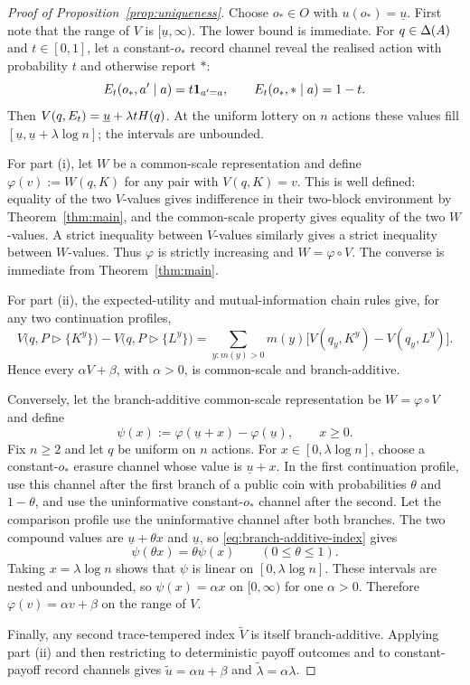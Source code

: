 \begin{proof}[Proof of Proposition~\ref{prop:uniqueness}]
Choose $o_*\in O$ with $u(o_*)=\underline u$.  First note that the range of $V$ is
$[\underline u,\infty)$.  The lower bound is immediate.  For $q\in\Delta(A)$ and $t\in[0,1]$, let a constant-$o_*$
record channel reveal the realised action with
probability $t$ and otherwise report $*$:
\[
 E_t(o_*,a'\mid a)=t\mathbf 1_{a'=a},
 \qquad
 E_t(o_*,*\mid a)=1-t.
\]
Then $V(q,E_t)=\underline u+\lambda tH(q)$.  At the uniform lottery on $n$ actions these values fill
$[\underline u,\underline u+\lambda\log n]$; the intervals are unbounded.

For part \textup{(i)}, let $W$ be a common-scale representation and define
$\varphi(v):=W(q,K)$ for any pair with $V(q,K)=v$.  This is well defined: equality of the two $V$-values gives
indifference in their two-block environment by Theorem~\ref{thm:main}, and the common-scale property gives equality
of the two $W$-values.  A strict inequality between $V$-values similarly gives a strict inequality between
$W$-values.  Thus $\varphi$ is strictly increasing and $W=\varphi\circ V$.  The converse is immediate from
Theorem~\ref{thm:main}.

For part \textup{(ii)}, the expected-utility and mutual-information chain rules give, for any two continuation
profiles,
\[
 V\bigl(q,P\triangleright\{K^y\}\bigr)
 -V\bigl(q,P\triangleright\{L^y\}\bigr)
 =\sum_{y:m(y)>0}m(y)
 \bigl[V(q_y,K^y)-V(q_y,L^y)\bigr].
\]
Hence every $\alpha V+\beta$, with $\alpha>0$, is common-scale and branch-additive.

Conversely, let the branch-additive common-scale representation be $W=\varphi\circ V$ and define
\[
 \psi(x):=\varphi(\underline u+x)-\varphi(\underline u),
 \qquad x\ge0.
\]
Fix $n\ge2$ and let $q$ be uniform on $n$ actions.  For $x\in[0,\lambda\log n]$, choose a constant-$o_*$ erasure
channel whose value is $\underline u+x$.  In the first continuation profile, use this channel after the first branch
of a public coin with probabilities $\theta$ and $1-\theta$, and use the uninformative constant-$o_*$ channel after
the second.  Let the comparison profile use the uninformative channel after both branches.  The two compound values
are $\underline u+\theta x$ and $\underline u$, so \eqref{eq:branch-additive-index} gives
\[
 \psi(\theta x)=\theta\psi(x)
 \qquad(0\le\theta\le1).
\]
Taking $x=\lambda\log n$ shows that $\psi$ is linear on $[0,\lambda\log n]$.  These intervals are nested and
unbounded, so $\psi(x)=\alpha x$ on $[0,\infty)$ for one $\alpha>0$.  Therefore
$\varphi(v)=\alpha v+\beta$ on the range of $V$.

Finally, any second trace-tempered index $\widetilde V$ is itself branch-additive.  Applying part \textup{(ii)} and
then restricting to deterministic payoff outcomes and to constant-payoff record channels gives
$\widetilde u=\alpha u+\beta$ and $\widetilde\lambda=\alpha\lambda$.
\end{proof}

